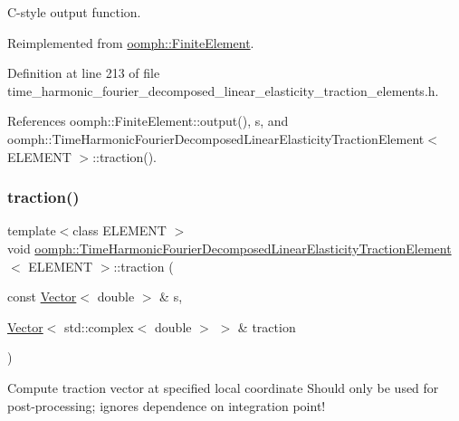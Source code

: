 C-\/style output function. 



Reimplemented from \hyperlink{classoomph_1_1FiniteElement_adfaee690bb0608f03320eeb9d110d48c}{oomph\+::\+Finite\+Element}.



Definition at line 213 of file time\+\_\+harmonic\+\_\+fourier\+\_\+decomposed\+\_\+linear\+\_\+elasticity\+\_\+traction\+\_\+elements.\+h.



References oomph\+::\+Finite\+Element\+::output(), s, and oomph\+::\+Time\+Harmonic\+Fourier\+Decomposed\+Linear\+Elasticity\+Traction\+Element$<$ E\+L\+E\+M\+E\+N\+T $>$\+::traction().

\mbox{\label{classoomph_1_1TimeHarmonicFourierDecomposedLinearElasticityTractionElement_ae52e642a75d71228bc008d06c4201092}} 
\subsubsection{\texorpdfstring{traction()}{traction()}}
{\footnotesize\ttfamily template$<$class E\+L\+E\+M\+E\+NT $>$ \\
void \hyperlink{classoomph_1_1TimeHarmonicFourierDecomposedLinearElasticityTractionElement}{oomph\+::\+Time\+Harmonic\+Fourier\+Decomposed\+Linear\+Elasticity\+Traction\+Element}$<$ E\+L\+E\+M\+E\+NT $>$\+::traction (\begin{DoxyParamCaption}\item[{const \hyperlink{classoomph_1_1Vector}{Vector}$<$ double $>$ \&}]{s,  }\item[{\hyperlink{classoomph_1_1Vector}{Vector}$<$ std\+::complex$<$ double $>$ $>$ \&}]{traction }\end{DoxyParamCaption})}



Compute traction vector at specified local coordinate Should only be used for post-\/processing; ignores dependence on integration point! 

